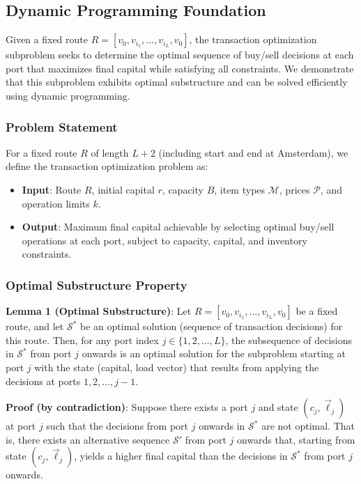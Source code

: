 \documentclass[12pt]{article}
\begin{document}
\subsection{Dynamic Programming Foundation}

Given a fixed route $R = [v_0, v_{i_1}, ..., v_{i_L}, v_0]$, the transaction optimization subproblem seeks to determine the optimal sequence of buy/sell decisions at each port that maximizes final capital while satisfying all constraints. We demonstrate that this subproblem exhibits optimal substructure and can be solved efficiently using dynamic programming.

\subsubsection{Problem Statement}

For a fixed route $R$ of length $L+2$ (including start and end at Amsterdam), we define the transaction optimization problem as:
\begin{itemize}
    \item \textbf{Input}: Route $R$, initial capital $r$, capacity $B$, item types $\mathcal{M}$, prices $\mathcal{P}$, and operation limits $k$.
    \item \textbf{Output}: Maximum final capital achievable by selecting optimal buy/sell operations at each port, subject to capacity, capital, and inventory constraints.
\end{itemize}

\subsubsection{Optimal Substructure Property}

\textbf{Lemma 1 (Optimal Substructure)}: Let $R = [v_0, v_{i_1}, ..., v_{i_L}, v_0]$ be a fixed route, and let $\mathcal{S}^*$ be an optimal solution (sequence of transaction decisions) for this route. Then, for any port index $j \in \{1, 2, ..., L\}$, the subsequence of decisions in $\mathcal{S}^*$ from port $j$ onwards is an optimal solution for the subproblem starting at port $j$ with the state (capital, load vector) that results from applying the decisions at ports $1, 2, ..., j-1$.

\textbf{Proof (by contradiction)}: Suppose there exists a port $j$ and state $(c_j, \vec{\ell}_j)$ at port $j$ such that the decisions from port $j$ onwards in $\mathcal{S}^*$ are not optimal. That is, there exists an alternative sequence $\mathcal{S}'$ from port $j$ onwards that, starting from state $(c_j, \vec{\ell}_j)$, yields a higher final capital than the decisions in $\mathcal{S}^*$ from port $j$ onwards. 
\end{document}
